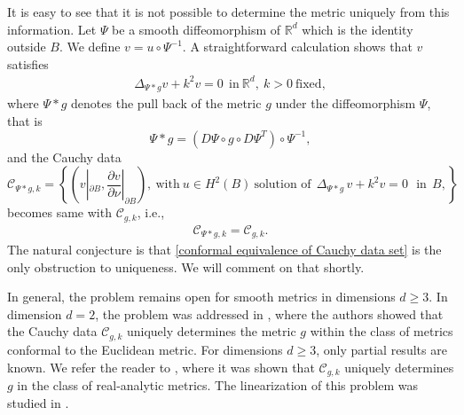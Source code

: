 \documentclass[12pt]{amsart}
\numberwithin{equation}{section}
\theoremstyle{definition}
\theoremstyle{remark}
\numberwithin{equation}{section}
\newcommand{\R}{{\mathbb R}}
\begin{document}
	
	It is easy to see that it is not possible to determine the metric uniquely from this information. Let $\Psi$ be a smooth diffeomorphism  of $\R^d$ which is the identity outside $B$. We define $v=u\circ \Psi^{-1}$. A straightforward calculation shows that $v$ satisfies 
	\begin{align}\label{conformal equation}
		\Delta_{\Psi*g}v+k^2 v=0 \ \ \text{in} \ \R^d, \ k>0 \ \text{fixed},
	\end{align}
	where $\Psi*g$ denotes the pull back of the metric $g$ under the diffeomorphism $\Psi$, that is
	\[
	\Psi*g= (D\Psi\circ g\circ D\Psi^T)\circ \Psi^{-1},
	\]
	and the Cauchy data
	\[
	\mathcal{C}_{\Psi*g,k}=\left\{ \left(v|_{\partial B}, \frac{\partial v}{\partial \nu}|_{\partial B}\right), \ \text{with}\ u\in H^2(B) \ \text{solution of}\ \ \Delta_{\Psi\ast g} \,v+k^2v=0 \ \ \ \mbox{in}\ \ B,\right\}
	\]
	becomes same with $\mathcal{C}_{g,k}$, i.e.,
	\begin{align}\label{conformal equivalence of Cauchy data set}
		\mathcal{C}_{\Psi*g,k}= \mathcal{C}_{g,k}.
	\end{align}
	The natural conjecture is that \eqref{conformal equivalence of Cauchy data set} is the only obstruction to uniqueness. We will comment on that shortly. 
	
	\medskip
	
	In general, the problem remains open for smooth metrics in dimensions \(d \geq 3\). In dimension \(d = 2\), the problem was addressed in \cite{sylvester1991inverse}, where the authors showed that the Cauchy data \(\mathcal{C}_{g,k}\) uniquely determines the metric \(g\) within the class of metrics conformal to the Euclidean metric. For dimensions \(d \geq 3\), only partial results are known. We refer the reader to \cite{lee1989determining}, where it was shown that \(\mathcal{C}_{g,k}\) uniquely determines \(g\) in the class of real-analytic metrics. The linearization of this problem was studied in \cite{sylvester1987global}.
	
\end{document}
